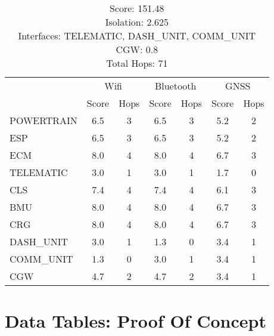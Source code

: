 \begin{table}[ht]
    \centering
    \caption{ \\ Score: 151.48 \\ Isolation: 2.625 \\ Interfaces: TELEMATIC, DASH\_UNIT, COMM\_UNIT \\ CGW: 0.8 \\ Total Hops: 71}
    \label{tab:arch10}
    \begin{tabular}{lcccccc}
    \hline
    & \multicolumn{2}{c}{Wifi} & \multicolumn{2}{c}{Bluetooth} & \multicolumn{2}{c}{GNSS} \\
    & Score & Hops & Score & Hops & Score & Hops \\
    \hline
        POWERTRAIN & 6.5 & 3 & 6.5 & 3 & 5.2 & 2 \\
        ESP & 6.5 & 3 & 6.5 & 3 & 5.2 & 2 \\
        ECM & 8.0 & 4 & 8.0 & 4 & 6.7 & 3 \\
        TELEMATIC & 3.0 & 1 & 3.0 & 1 & 1.7 & 0 \\
        CLS & 7.4 & 4 & 7.4 & 4 & 6.1 & 3 \\
        BMU & 8.0 & 4 & 8.0 & 4 & 6.7 & 3 \\
        CRG & 8.0 & 4 & 8.0 & 4 & 6.7 & 3 \\
        DASH\_UNIT & 3.0 & 1 & 1.3 & 0 & 3.4 & 1 \\
        COMM\_UNIT & 1.3 & 0 & 3.0 & 1 & 3.4 & 1 \\
        CGW & 4.7 & 2 & 4.7 & 2 & 3.4 & 1 \\
    \hline
    \end{tabular}
\end{table}

\newpage

\chapter{Data Tables: Proof Of Concept}
\label{app:proofOfConcept}

